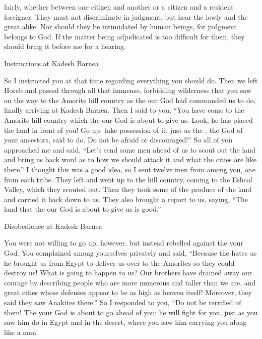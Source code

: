 {fairly,
whether
between
one
citizen and another
or a citizen and a resident foreigner.
They must not
discriminate
in judgment,
but hear
the lowly
and the great
alike. Nor
should they be intimidated
by human beings,
for
judgment
belongs to God.
If
the matter
being adjudicated is too
difficult
for them,
they should bring it before me
for a hearing.
\par }{\SH Instructions at Kadesh Barnea
\par }{\PP {}So I instructed
you at that time
regarding everything
you should do.
Then we left
Horeb
and passed through
all
that immense,
forbidding
wilderness
that
you saw
on the way
to the Amorite
hill country
as the
{}
our God
had commanded
us to do, finally
arriving
at Kadesh Barnea.
Then I said
to
you, “You have come
to
the Amorite
hill country
which
the {}
our God
is about to give us.
Look,
he has placed
the land
in front
of you! Go up,
take possession
of it, just as
the {}, the God
of your ancestors,
said
to do. Do
not
be afraid
or
discouraged!”
So all
of you approached
me
and said,
“Let’s send
some men
ahead
of us to scout
out the land
and bring
us back
word
as to how we should
attack
it and
what the
cities
are like
there.”
I thought this was a good
idea, so
I sent twelve
men
from among you, one
from each
tribe.
They left
and went up
to the hill country,
coming
to the Eshcol
Valley,
which they scouted out.
Then they took
some of the produce
of the land
and carried it back
down
to
us. They also brought a report
to us, saying,
“The land
that
the {}
our God
is about to give
us is good.”
\par }{\SH Disobedience at Kadesh Barnea
\par }{\PP {}You were not
willing
to go up,
however, but instead rebelled
against the
{}
your God.
You complained
among yourselves privately
and said,
“Because the
{}
hates
us he brought
us from Egypt
to deliver
us over
to the Amorites
so they could destroy us!
What
is going to happen to us? Our
brothers
have drained
away our courage
by describing
people
who are more
numerous and taller
than
we are, and great
cities
whose defenses
appear to be as high
as heaven
itself! Moreover,
they said
they saw
Anakites
there.”
So I responded to
you, “Do not
be
terrified
of them!
The
{}
your God
is about to go
ahead
of you; he
will fight
for you, just
as you saw him
do
in Egypt
and in the desert,
where
you saw
him
carrying
you along like
a man
}
